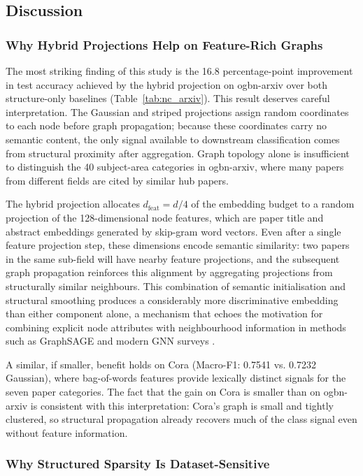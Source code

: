 \documentclass[conference]{IEEEtran}
\begin{document}
\subsection{Discussion}

\subsubsection{Why Hybrid Projections Help on Feature-Rich Graphs}

The most striking finding of this study is the 16.8 percentage-point
improvement in test accuracy achieved by the hybrid projection on ogbn-arxiv
over both structure-only baselines (Table~\ref{tab:nc_arxiv}). This result
deserves careful interpretation. The Gaussian and striped projections assign
random coordinates to each node before graph propagation; because these
coordinates carry no semantic content, the only signal available to
downstream classification comes from structural proximity after aggregation.
Graph topology alone is insufficient to distinguish the 40 subject-area
categories in ogbn-arxiv, where many papers from different fields are
cited by similar hub papers.

The hybrid projection allocates $d_\text{feat} = d/4$ of the embedding budget
to a random projection of the 128-dimensional node features, which are
paper title and abstract embeddings generated by skip-gram word vectors.
Even after a single feature projection step, these dimensions encode
semantic similarity: two papers in the same sub-field will have nearby
feature projections, and the subsequent graph propagation reinforces this
alignment by aggregating projections from structurally similar neighbours.
This combination of semantic initialisation and structural smoothing produces
a considerably more discriminative embedding than either component alone, a
mechanism that echoes the motivation for combining explicit node attributes
with neighbourhood information in methods such as GraphSAGE \cite{khemani2024}
and modern GNN surveys \cite{gkarmpounis2024}.

A similar, if smaller, benefit holds on Cora (Macro-F1: 0.7541
vs. 0.7232 Gaussian), where bag-of-words features provide lexically
distinct signals for the seven paper categories. The fact that the gain
on Cora is smaller than on ogbn-arxiv is consistent with this interpretation:
Cora's graph is small and tightly clustered, so structural propagation
already recovers much of the class signal even without feature information.

\subsubsection{Why Structured Sparsity Is Dataset-Sensitive}
\end{document}
